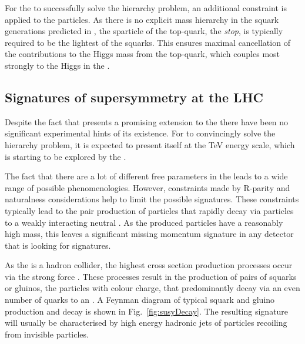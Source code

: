 For the \MSSM to successfully solve the hierarchy problem, an
additional constraint is applied to the \SUSY particles. As there is
no explicit mass hierarchy in the squark generations predicted in
\SUSY, the sparticle of the top-quark, the \emph{stop}, is typically
required to be the lightest of the squarks. This ensures maximal
cancellation of the contributions to the Higgs mass from the
top-quark, which couples most strongly to the Higgs in the \SM.

\subsection{Signatures of supersymmetry at the LHC}

Despite the fact that \SUSY presents a promising extension to the \SM
there have been no significant experimental hints of its existence.
For
\SUSY to convincingly solve the hierarchy problem, it is expected to
present itself at the TeV energy scale, which is
starting to be explored by the \LHC. 

The fact that there are a lot of different free parameters in the
\MSSM leads to a wide range of possible \SUSY phenomenologies.
However, constraints made by R-parity and naturalness
considerations help to limit the possible signatures. These
constraints typically lead to the pair production of \SUSY particles
that rapidly decay via \SM particles to a weakly interacting neutral \LSP. 
As the produced \SUSY particles have a reasonably high mass, this
leaves a significant missing momentum signature in any detector that
is looking for \SUSY signatures.

As the \LHC is a hadron collider, the highest cross section \SUSY
production processes occur via the strong force \cite{Martin:1997ns}
\cite{SUSYxsections_NewAspectsof_pp_collisions}. These processes
result in the production of pairs of squarks or gluinos, the \SUSY
particles with colour charge, that predominantly decay via an even
number of \SM quarks to an \LSP. A Feynman diagram of typical squark
and gluino production and decay is shown in Fig.~\ref{fig:susyDecay}.
The resulting signature will usually be characterised by high energy
hadronic jets of \SM particles recoiling from invisible particles.

